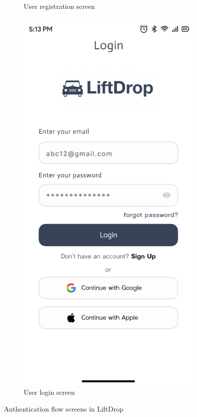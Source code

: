 \begin{figure}[H]
\begin{subfigure}[b]{0.44\textwidth}
        \caption{User registration screen}
        \label{fig:registration}
    \end{subfigure}
    \hfill
    \begin{subfigure}[b]{0.44\textwidth}
        \centering
        \includegraphics[width=\textwidth]{images/login.png}
        \caption{User login screen}
        \label{fig:login}
    \end{subfigure}
    \caption{Authentication flow screens in LiftDrop}
    \label{fig:auth_flow}
\end{figure}

